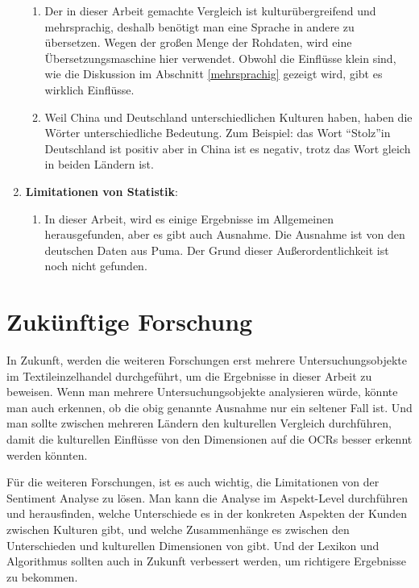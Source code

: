 \begin{enumerate}
	\begin{enumerate}
		\item Der in dieser Arbeit gemachte Vergleich ist kulturübergreifend und mehrsprachig, deshalb benötigt man eine Sprache in andere zu übersetzen. Wegen der großen Menge der Rohdaten, wird eine Übersetzungsmaschine hier verwendet. Obwohl die Einflüsse klein sind, wie die Diskussion im Abschnitt \ref{mehrsprachig} gezeigt wird, gibt es wirklich Einflüsse.
		\item Weil China und Deutschland unterschiedlichen Kulturen haben, haben die Wörter unterschiedliche Bedeutung. Zum Beispiel: das Wort ``Stolz''in Deutschland ist positiv aber in China ist es negativ, trotz das Wort gleich in beiden Ländern ist.
	\end{enumerate}
	\item \textbf{Limitationen von Statistik}:
	\begin{enumerate}
		\item In dieser Arbeit, wird es einige Ergebnisse im Allgemeinen herausgefunden, aber es gibt auch Ausnahme. Die Ausnahme ist von den deutschen Daten aus Puma. Der Grund dieser Außerordentlichkeit ist noch nicht gefunden.  
	\end{enumerate}
\end{enumerate}
\section{Zukünftige Forschung}
In Zukunft, werden die weiteren Forschungen erst mehrere Untersuchungsobjekte im Textileinzelhandel durchgeführt, um die Ergebnisse in dieser Arbeit zu beweisen. Wenn man mehrere Untersuchungsobjekte analysieren würde, könnte man auch erkennen, ob die obig genannte Ausnahme nur ein seltener Fall ist. Und man sollte zwischen mehreren Ländern den kulturellen Vergleich durchführen, damit die kulturellen Einflüsse von den Dimensionen auf die \acl{OCRs} besser erkennt werden könnten. 

Für die weiteren Forschungen, ist es auch wichtig, die Limitationen von der Sentiment Analyse zu lösen. Man kann die Analyse im Aspekt-Level durchführen und herausfinden, welche Unterschiede es in der konkreten Aspekten der Kunden zwischen Kulturen gibt, und welche Zusammenhänge es zwischen den Unterschieden und kulturellen Dimensionen von \citeauthor{hofstede2013interkulturelle} gibt. Und der Lexikon und Algorithmus sollten auch in Zukunft verbessert werden, um richtigere Ergebnisse zu bekommen.

